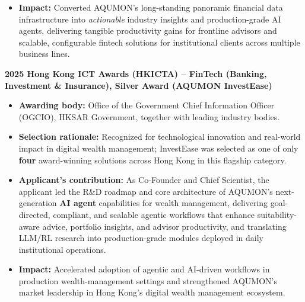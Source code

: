 \documentclass[11pt]{article}
\newenvironment{tightitemize}{%
  \begin{itemize}[leftmargin=*,nosep,topsep=2pt]
}{\end{itemize}}
\begin{document}
\begin{tightitemize}
\begin{tightitemize}
  \end{tightitemize}
  The applicant also led the extension of these capabilities into institution-specific deployments (insurance, pensions, and trusts), enabling customizable tools such as an intelligent retirement calculator, an institutional-grade portfolio management system, and deep fund-comparison analytics tailored to pension and ILP/ILAS decision contexts.
  \item \textbf{Impact:} Converted AQUMON’s long-standing panoramic financial data infrastructure into \emph{actionable} industry insights and production-grade AI agents, delivering tangible productivity gains for frontline advisors and scalable, configurable fintech solutions for institutional clients across multiple business lines.
\end{tightitemize}

\noindent\textbf{2025 \quad Hong Kong ICT Awards (HKICTA) -- FinTech (Banking, Investment \& Insurance), Silver Award (AQUMON InvestEase)}\\
\begin{tightitemize}
  \item \textbf{Awarding body:} Office of the Government Chief Information Officer (OGCIO), HKSAR Government, together with leading industry bodies.
  \item \textbf{Selection rationale:} Recognized for technological innovation and real-world impact in digital wealth management; InvestEase was selected as one of only \textbf{four} award-winning solutions across Hong Kong in this flagship category.
  \item \textbf{Applicant's contribution:} As Co-Founder and Chief Scientist, the applicant led the R\&D roadmap and core architecture of AQUMON’s next-generation \textbf{AI agent} capabilities for wealth management, delivering goal-directed, compliant, and scalable agentic workflows that enhance suitability-aware advice, portfolio insights, and advisor productivity, and translating LLM/RL research into production-grade modules deployed in daily institutional operations.
  \item \textbf{Impact:} Accelerated adoption of agentic and AI-driven workflows in production wealth-management settings and strengthened AQUMON’s market leadership in Hong Kong’s digital wealth management ecosystem.
\end{tightitemize}

\vspace{0.6em}
\end{document}
